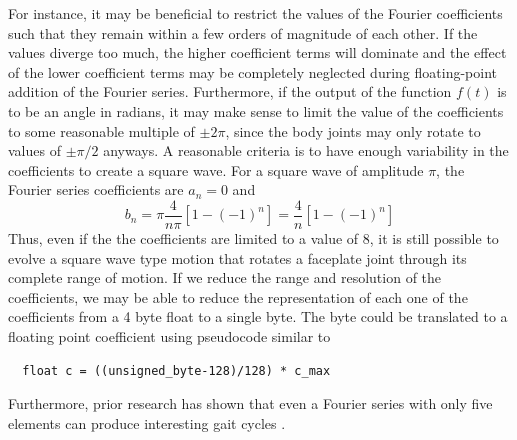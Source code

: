   For instance, it may be beneficial to restrict the values of the Fourier coefficients such that 
  they remain within a few orders of magnitude of each other. If the values diverge too much,
  the higher coefficient terms will dominate and the effect of the lower coefficient terms
  may be completely neglected during floating-point addition of the Fourier series. Furthermore, if the output of the function
  $f(t)$ is to be an angle in radians, it may make sense to limit the value of the coefficients
  to some reasonable multiple of $\pm2\pi$, since the body joints may only rotate to values
  of $\pm\pi/2$ anyways. A reasonable criteria is to have enough variability 
  in the coefficients to create a square wave. For a square wave of amplitude $\pi$, the Fourier series coefficients
  are $a_n = 0$ and 
  \begin{equation}
  b_n = \pi \frac{4}{n \pi} [1 - (-1)^n]
  =
  \frac{4}{n} [1 - (-1)^n]
  \end{equation}
  Thus, even if the the coefficients are limited to a value of $8$, it is still possible to
  evolve a square wave type motion that rotates a faceplate joint through its complete range of motion. 
  If we reduce the range and resolution of the coefficients, 
  we may be able to reduce the representation of each one of the coefficients from a 
  4 byte float to a single byte. The byte could be translated to a floating point
  coefficient using pseudocode similar to 
  \begin{verbatim}
  float c = ((unsigned_byte-128)/128) * c_max
  \end{verbatim}
  Furthermore, prior research has shown that even a Fourier series with
  only five elements can produce interesting gait cycles \cite{Yang2006}. 


